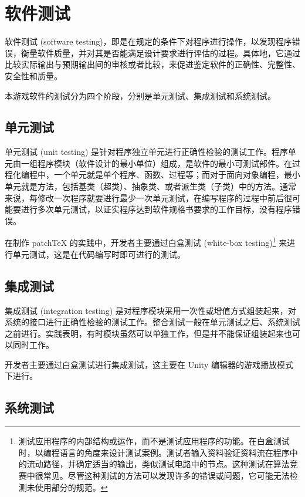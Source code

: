 
\chapter{软件测试}

软件测试 (software testing)，即是在规定的条件下对程序进行操作，以发现程序错误，衡量软件质量，并对其是否能满足设计要求进行评估的过程。具体地，它通过比较实际输出与预期输出间的审核或者比较，来促进鉴定软件的正确性、完整性、安全性和质量。\cite{softwaretestwiki}

本游戏软件的测试分为四个阶段，分别是单元测试、集成测试和系统测试。

\section{单元测试}

单元测试 (unit testing) 是针对程序独立单元进行正确性检验的测试工作。程序单元由一组程序模块（软件设计的最小单位）组成，是软件的最小可测试部件。在过程化编程中，一个单元就是单个程序、函数、过程等；而对于面向对象编程，最小单元就是方法，包括基类（超类）、抽象类、或者派生类（子类）中的方法。通常来说，每修改一次程序就要进行最少一次单元测试，在编写程序的过程中前后很可能要进行多次单元测试，以证实程序达到软件规格书要求的工作目标，没有程序错误。\cite{unittestwiki}

在制作 patchTeX 的实践中，开发者主要通过白盒测试 (white-box testing)\footnote{测试应用程序的内部结构或运作，而不是测试应用程序的功能。在白盒测试时，以编程语言的角度来设计测试案例。测试者输入资料验证资料流在程序中的流动路径，并确定适当的输出，类似测试电路中的节点。这种测试在算法竞赛中很常见。尽管这种测试的方法可以发现许多的错误或问题，它可能无法检测未使用部分的规范。} 来进行单元测试，这是在代码编写时即可进行的测试。

\section{集成测试}

集成测试 (integration testing) 是对程序模块采用一次性或增值方式组装起来，对系统的接口进行正确性检验的测试工作。整合测试一般在单元测试之后、系统测试之前进行。实践表明，有时模块虽然可以单独工作，但是并不能保证组装起来也可以同时工作。\cite{inttestwiki}

开发者主要通过白盒测试进行集成测试，这主要在 Unity 编辑器的游戏播放模式下进行。

\section{系统测试}

